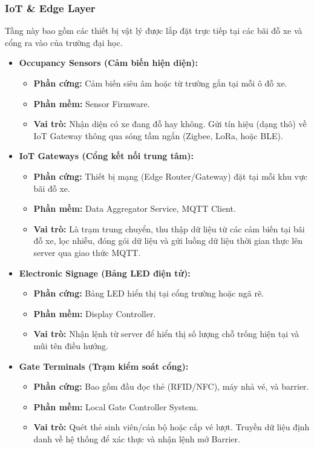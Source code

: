 \subsubsection{IoT \& Edge Layer}
Tầng này bao gồm các thiết bị vật lý được lắp đặt trực tiếp tại các bãi đỗ xe và cổng ra vào của trường đại học.
\begin{itemize}
    \item \textbf{Occupancy Sensors (Cảm biến hiện diện):}
    \begin{itemize}
        \item \textbf{Phần cứng:} Cảm biến siêu âm hoặc từ trường gắn tại mỗi ô đỗ xe.
        \item \textbf{Phần mềm:} Sensor Firmware.
        \item \textbf{Vai trò:} Nhận diện có xe đang đỗ hay không. Gửi tín hiệu (dạng thô) về IoT Gateway thông qua sóng tầm ngắn (Zigbee, LoRa, hoặc BLE).
    \end{itemize}
    \item \textbf{IoT Gateways (Cổng kết nối trung tâm):}
    \begin{itemize}
        \item \textbf{Phần cứng:} Thiết bị mạng (Edge Router/Gateway) đặt tại mỗi khu vực bãi đỗ xe.
        \item \textbf{Phần mềm:} Data Aggregator Service, MQTT Client.
        \item \textbf{Vai trò:} Là trạm trung chuyển, thu thập dữ liệu từ các cảm biến tại bãi đỗ xe, lọc nhiễu, đóng gói dữ liệu và gửi luồng dữ liệu thời gian thực lên server qua giao thức MQTT.
    \end{itemize}
    \item \textbf{Electronic Signage (Bảng LED điện tử):}
    \begin{itemize}
        \item \textbf{Phần cứng:} Bảng LED hiển thị tại cổng trường hoặc ngã rẽ.
        \item \textbf{Phần mềm:} Display Controller.
        \item \textbf{Vai trò:} Nhận lệnh từ server để hiển thị số lượng chỗ trống hiện tại và mũi tên điều hướng.
    \end{itemize}
    \item \textbf{Gate Terminals (Trạm kiểm soát cổng):}
    \begin{itemize}
        \item \textbf{Phần cứng:} Bao gồm đầu đọc thẻ (RFID/NFC), máy nhả vé, và barrier.
        \item \textbf{Phần mềm:} Local Gate Controller System.
        \item \textbf{Vai trò:} Quét thẻ sinh viên/cán bộ hoặc cấp vé lượt. Truyền dữ liệu định danh về hệ thống để xác thực và nhận lệnh mở Barrier.
    \end{itemize}
\end{itemize}
